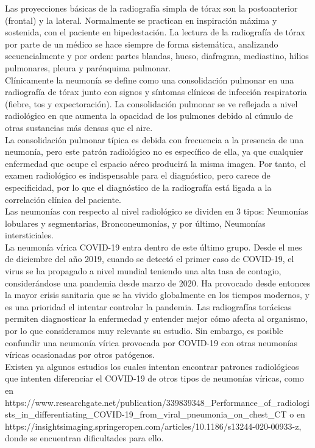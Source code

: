\documentclass[11pt,a4paper]{article}
\theoremstyle{definition}
\begin{document}
Las proyecciones básicas de la radiografía simpla de tórax son la postoanterior (frontal) y la lateral.  Normalmente se practican en inspiración máxima y sostenida,  con el paciente en bipedestación.  La lectura de la radiografía de tórax por parte de un médico se hace siempre de forma sistemática, analizando secuencialmente y por orden: partes blandas, hueso, diafragma, mediastino, hilios pulmonares, pleura y parénquima pulmonar.\\

Clínicamente la neumonía se define como una consolidación pulmonar en una radiografía de tórax junto con signos y síntomas clínicos de infección respiratoria (fiebre, tos y expectoración). La consolidación pulmonar se ve reflejada a nivel radiológico en que aumenta la opacidad de los pulmones debido al cúmulo de otras sustancias más densas que el aire.\\

La consolidación pulmonar típica es debida con frecuencia a la presencia de una neumonía, pero este patrón radiológico no es específico de ella, ya que cualquier enfermedad que ocupe el espacio aéreo producirá la misma imagen. Por tanto, el examen radiológico es indispensable para el diagnóstico, pero carece de especificidad, por lo que el diagnóstico de la radiografía está ligada a la correlación clínica del paciente.\\

Las neumonías con respecto al nivel radiológico se dividen en 3 tipos: Neumonías lobulares y segmentarias, Bronconeumonías, y por último, Neumonías intersticiales. \\

La neumonía vírica COVID-19 entra dentro de este último grupo.  Desde el mes de diciembre del año 2019,  cuando se detectó el primer caso de COVID-19,  el virus se ha propagado a nivel mundial teniendo una alta tasa de contagio, considerándose una pandemia desde marzo de 2020.  Ha provocado desde entonces la mayor crisis sanitaria que se ha vivido globalmente en los tiempos modernos, y es una prioridad el intentar controlar la pandemia. Las radiografías torácicas permiten diagnosticar la enfermedad y entender mejor cómo afecta al organismo, por lo que consideramos muy relevante su estudio.  Sin embargo,  es posible confundir una neumonía vírica provocada por COVID-19 con otras neumonías víricas ocasionadas por otros patógenos. \\

Existen ya algunos estudios los cuales intentan encontrar patrones radiológicos que intenten diferenciar el COVID-19 de otros tipos de neumonías víricas, como en https://www.researchgate.net/publication/339839348\_Performance\_of\_radiologists\_in\_differentiating\_COVID-19\_from\_viral\_pneumonia\_on\_chest\_CT
 o en https://insightsimaging.springeropen.com/articles/10.1186/s13244-020-00933-z,  donde se encuentran dificultades para ello.\\
\end{document}
